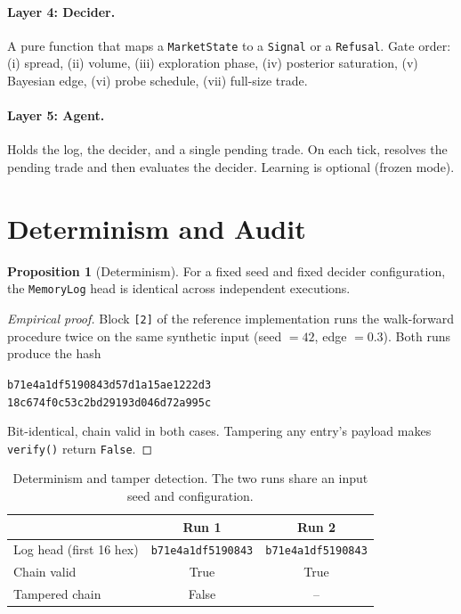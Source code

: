 \documentclass[11pt,a4paper]{article}
\newcommand{\gld}[1]{\textcolor{goldshiny}{#1}}
\newcommand{\cel}[1]{\textcolor{celadon}{#1}}
\theoremstyle{definition}
\newtheorem{proposition}{Proposition}
\begin{document}
\paragraph{Layer 4: Decider.}
A pure function that maps a \texttt{MarketState} to a \texttt{Signal} or a \texttt{Refusal}. Gate order: (i) spread, (ii) volume, (iii) exploration phase, (iv) posterior saturation, (v) Bayesian edge, (vi) probe schedule, (vii) full-size trade.

\paragraph{Layer 5: Agent.}
Holds the log, the decider, and a single pending trade. On each tick, resolves the pending trade and then evaluates the decider. Learning is optional (frozen mode).

\section{Determinism and Audit}
\label{sec:audit}

\begin{proposition}[Determinism]
\label{prop:det}
For a fixed seed and fixed decider configuration, the \texttt{MemoryLog} head is identical across independent executions.
\end{proposition}

\begin{proof}[Empirical proof]
Block \texttt{[2]} of the reference implementation runs the walk-forward procedure twice on the same synthetic input (seed $=42$, edge $=0.3$). Both runs produce the hash
\begin{center}
\cel{\texttt{b71e4a1df5190843d57d1a15ae1222d3}}\\
\cel{\texttt{18c674f0c53c2bd29193d046d72a995c}}
\end{center}
Bit-identical, chain valid in both cases. Tampering any entry's payload makes \texttt{verify()} return \texttt{False}.
\end{proof}

\begin{table}[ht]
\centering
\caption{Determinism and tamper detection. The two runs share an input seed and configuration.}
\label{tab:determinism}
\renewcommand{\arraystretch}{1.15}
\begin{tabular}{lcc}
\toprule
\gld{ } & \gld{Run 1} & \gld{Run 2} \\
\midrule
Log head (first 16 hex) & \cel{\texttt{b71e4a1df5190843}} & \cel{\texttt{b71e4a1df5190843}} \\
Chain valid & True & True \\
Tampered chain & False & -- \\
\bottomrule
\end{tabular}
\end{table}
\end{document}
